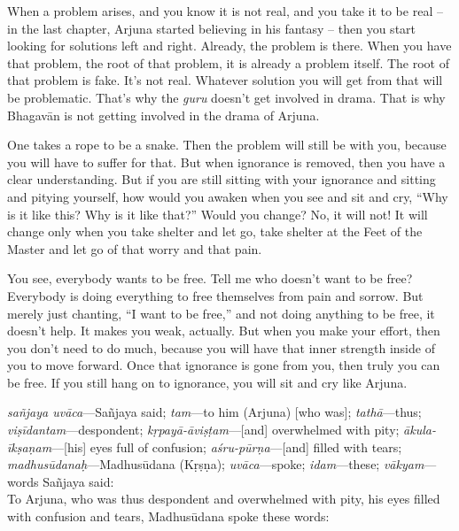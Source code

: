 When a problem arises, and you know it is not real, and you take it to be real -- in the last chapter, Arjuna started believing in his fantasy -- then you start looking for solutions left and right. Already, the problem is there. When you have that problem, the root of that problem, it is already a problem itself. The root of that problem is fake. It’s not real. Whatever solution you will get from that will be problematic. That’s why the \textit{guru} doesn’t get involved in drama. That is why Bhagavān is not getting involved in the drama of Arjuna.

One takes a rope to be a snake. Then the problem will still be with you, because you will have to suffer for that. But when ignorance is removed, then you have a clear understanding. But if you are still sitting with your ignorance and sitting and pitying yourself, how would you awaken when you see and sit and cry, “Why is it like this? Why is it like that?” Would you change? No, it will not! It will change only when you take shelter and let go, take shelter at the Feet of the Master and let go of that worry and that pain.

You see, everybody wants to be free. Tell me who doesn’t want to be free? Everybody is doing everything to free themselves from pain and sorrow. But merely just chanting, “I want to be free,” and not doing anything to be free, it doesn’t help. It makes you weak, actually. But when you make your effort, then you don’t need to do much, because you will have that inner strength inside of you to move forward. Once that ignorance is gone from you, then truly you can be free. If you still hang on to ignorance, you will sit and cry like Arjuna.

{%
  \textit{sañjaya uvāca}---Sañjaya said; 
  \textit{tam}---to him (Arjuna) [who was]; 
  \textit{tathā}---thus; 
  \textit{viṣīdantam}---despondent; 
  \textit{kṛpayā-āviṣṭam}---[and] overwhelmed with pity; 
  \textit{ākula-īkṣaṇam}---[his] eyes full of confusion; 
  \textit{aśru-pūrṇa}---[and] filled with tears; 
  \textit{madhusūdanaḥ}---Madhusūdana (Kṛṣṇa); 
  \textit{uvāca}---spoke; 
  \textit{idam}---these; 
  \textit{vākyam}---words
}
{%
  \hspace*{1em}Sañjaya said: \\
  To Arjuna, who was thus despondent and overwhelmed with pity, his eyes filled with confusion and tears, Madhusūdana spoke these words:
}

